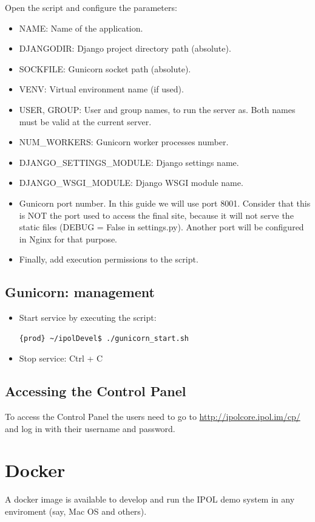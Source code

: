\documentclass[a4paper,12pt]{article}
\begin{document}
Open the script and configure the parameters:
\begin{itemize}
    \item NAME: Name of the application.
    \item DJANGODIR: Django project directory path (absolute).
    \item SOCKFILE: Gunicorn socket path (absolute).
    \item VENV: Virtual environment name (if used).
    \item USER, GROUP: User and group names, to run the server as. Both names must be valid at the current server.
    \item NUM\_WORKERS: Gunicorn worker processes number.
    \item DJANGO\_SETTINGS\_MODULE: Django settings name.
    \item DJANGO\_WSGI\_MODULE: Django WSGI module name.
    \item Gunicorn port number. In this guide we will use port 8001. Consider that this is NOT the port used to access the final site, because it will not serve the static files (DEBUG = False in settings.py). Another port will be configured in Nginx for that purpose.
    \item Finally, add execution permissions to the script.
\end{itemize}

\subsection{Gunicorn: management}
\begin{itemize}
    \item Start service by executing the script:
    \begin{lstlisting}[language=Bash]
    {prod} ~/ipolDevel$ ./gunicorn_start.sh
    \end{lstlisting}

    \item Stop service: Ctrl + C
\end{itemize}



\subsection{Accessing the Control Panel}
To access the Control Panel the users need to go to \url{http://ipolcore.ipol.im/cp/} and log in with their username and password.

\section{Docker}
A docker image is available to develop and run the IPOL demo system in any enviroment (say, Mac OS and others).
\end{document}
